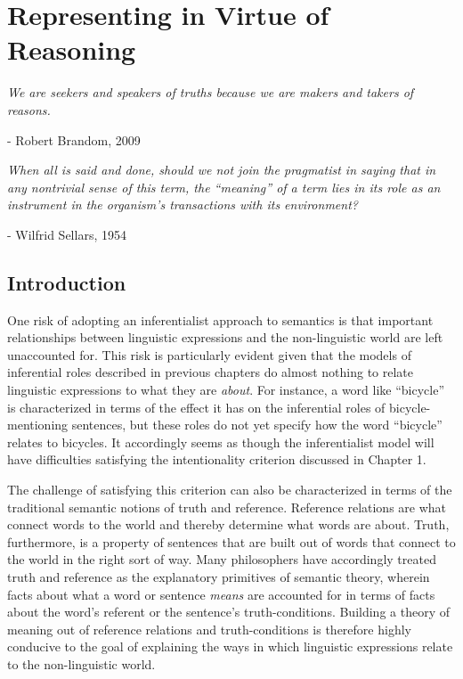 
\chapter{Representing in Virtue of Reasoning}
\renewcommand{\epigraphrule}{0pt}
\setlength{\epigraphwidth}{4.5in}
\epigraph{\textit{We are seekers and speakers of truths because we are makers and takers of reasons.}}{- Robert Brandom, 2009}

\epigraph{\textit{When all is said and done, should we not join the pragmatist in saying that in any nontrivial sense of this term, the ``meaning'' of a term lies in its role as an instrument in the organism's transactions with its environment?}}{- Wilfrid Sellars, 1954}

\section{Introduction}

One risk of adopting an inferentialist approach to semantics is that important relationships between linguistic expressions and the non-linguistic world are left unaccounted for. This risk is particularly evident given that the models of inferential roles described in previous chapters do almost nothing to relate linguistic expressions to what they are \textit{about}. For instance, a word like ``bicycle'' is characterized in terms of the effect it has on the inferential roles of bicycle-mentioning sentences, but these roles do not yet specify how the word ``bicycle'' relates to bicycles. It accordingly seems as though the inferentialist model will have difficulties satisfying the intentionality criterion discussed in Chapter 1.

The challenge of satisfying this criterion can also be characterized in terms of the traditional semantic notions of truth and reference. Reference relations are what connect words to the world and thereby determine what words are about. Truth, furthermore, is a property of sentences that are built out of words that connect to the world in the right sort of way. Many philosophers have accordingly treated truth and reference as the explanatory primitives of semantic theory, wherein facts about what a word or sentence \textit{means} are accounted for in terms of facts about the word's referent or the sentence's truth-conditions. Building a theory of meaning out of reference relations and truth-conditions is therefore highly conducive to the goal of explaining the ways in which linguistic expressions relate to the non-linguistic world.  

